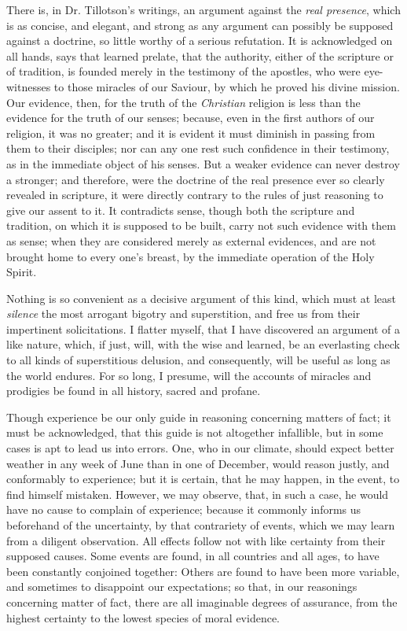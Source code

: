 \documentclass[]{article}
\begin{document}
\begin{sectionbody}

\humeparagraph  There is, in Dr. Tillotson's writings, an argument against the \emph{real presence}, which is as concise, and elegant, and strong as any argument can possibly be supposed against a doctrine, so little worthy of a serious refutation. It is acknowledged on all hands, says that learned prelate, that the authority, either of the scripture or of tradition, is founded merely in the testimony of the apostles, who were eye-witnesses to those miracles of our Saviour, by which he proved his divine mission. Our evidence, then, for the truth of the \emph{Christian} religion is less than the evidence for the truth of our senses; because, even in the first authors of our religion, it was no greater; and it is evident it must diminish in passing from them to their disciples; nor can any one rest such confidence in their testimony, as in the immediate object of his senses. But a weaker evidence can never destroy a stronger; and therefore, were the doctrine of the real presence ever so clearly revealed in scripture, it were directly contrary to the rules of just reasoning to give our assent to it. It contradicts sense, though both the scripture and tradition, on which it is supposed to be built, carry not such evidence with them as sense; when they are considered merely as external evidences, and are not brought home to every one's breast, by the immediate operation of the Holy Spirit.

\humeparagraph  Nothing is so convenient as a decisive argument of this kind, which must at least \emph{silence} the most arrogant bigotry and superstition, and free us from their impertinent solicitations. I flatter myself, that I have discovered an argument of a like nature, which, if just, will, with the wise and learned, be an everlasting check to all kinds of superstitious delusion, and consequently, will be useful as long as the world endures. For so long, I presume, will the accounts of miracles and prodigies be found in all history, sacred and profane.

\humeparagraph  Though experience be our only guide in reasoning concerning matters of fact; it must be acknowledged, that this guide is not altogether infallible, but in some cases is apt to lead us into errors. One, who in our climate, should expect better weather in any week of June than in one of December, would reason justly, and conformably to experience; but it is certain, that he may happen, in the event, to find himself mistaken. However, we may observe, that, in such a case, he would have no cause to complain of experience; because it commonly informs us beforehand of the uncertainty, by that contrariety of events, which we may learn from a diligent observation. All effects follow not with like certainty from their supposed causes. Some events are found, in all countries and all ages, to have been constantly conjoined together: Others are found to have been more variable, and sometimes to disappoint our expectations; so that, in our reasonings concerning matter of fact, there are all imaginable degrees of assurance, from the highest certainty to the lowest species of moral evidence.


\end{sectionbody}
\end{document}
